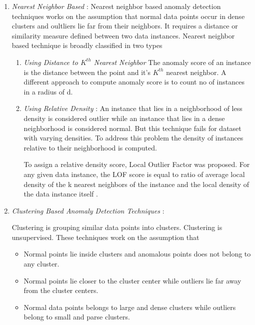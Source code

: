 \begin{enumerate}
	\item \textit {Nearest Neighbor Based } : Nearest neighbor based anomaly detection techniques works on the assumption that normal data points occur in dense clusters and oultliers lie far from their neighbors. It requires a distance or similarity
	measure defined between two data instances. Nearest neighbor based technique is broadly classified in two types
	
	\begin{enumerate}
		\item 
		\textit{Using Distance to $K^{th}$  Nearest Neighbor}
		The anomaly score of an instance is the distance between the point and it's $K^{th}$ nearest neighbor. A different approach to compute anomaly score is to count no of instances in a radius of d. 
		
		\item 
		\textit{Using Relative Density} : An instance that lies in a neighborhood of less density is considered outlier while an instance that lies in a dense neighborhood is considered normal. But this technique fails for dataset with varying densities. To address this problem the density of instances relative to their neighborhood is computed.
		
		\par To assign a relative density score, Local Outlier Factor was proposed. For any given data instance, the LOF score is equal to
		ratio of average local density of the k nearest neighbors of the instance and the local
		density of the data instance itself \cite{b}.
		
	\end{enumerate}
	
	
	
	\item \textit{Clustering Based Anomaly Detection Techniques} : 
	
	Clustering is grouping similar data points into clusters. Clustering is unsupervised. These techniques work on the assumption that
	\begin{itemize}
		\item Normal points lie inside clusters and anomalous points does not belong to any cluster.
		
		\item Normal points lie closer to the cluster center while outliers lie far away from the cluster centers.
		
		\item Normal data points belongs to large and dense clusters while outliers belong to small and parse clusters.
	\end{itemize} 
	
	
	
\end{enumerate}


